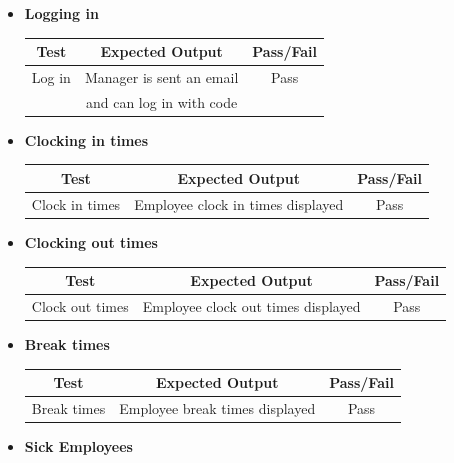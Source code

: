 \begin{itemize}
    \item \textbf{Logging in}
    \begin{center}
     \begin{tabular}{||c c c||} 
      \hline
      Test & Expected Output & Pass/Fail \\ [0.5ex] 
      \hline\hline
      Log in & Manager is sent an email & Pass \\
       & and can log in with code &  \\
      \hline
     \end{tabular}
    \end{center}
    \item \textbf{Clocking in times}
    \begin{center}
     \begin{tabular}{||c c c||} 
      \hline
      Test & Expected Output & Pass/Fail \\ [0.5ex] 
      \hline\hline
       Clock in times & Employee clock in times displayed & Pass \\
      \hline
     \end{tabular}
    \end{center}
    \item \textbf{Clocking out times}
    \begin{center}
     \begin{tabular}{||c c c||} 
      \hline
      Test & Expected Output & Pass/Fail \\ [0.5ex] 
      \hline\hline
       Clock out times & Employee clock out times displayed & Pass \\
      \hline
     \end{tabular}
    \end{center}
    \item \textbf{Break times}
    \begin{center}
     \begin{tabular}{||c c c||} 
      \hline
      Test & Expected Output & Pass/Fail \\ [0.5ex] 
      \hline\hline
      Break times & Employee break times displayed & Pass \\
      \hline
     \end{tabular}
    \end{center}
    \item \textbf{Sick Employees}
    \begin{center}
     \begin{tabular}{||c c c||} 
      \hline

\end{tabular}
\end{center}
\end{itemize}
